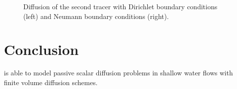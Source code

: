 \begin{figure}[h!]
\begin{minipage}[t]{0.5\textwidth}
 \centering
\end{minipage}
\begin{minipage}[t]{0.5\textwidth}
 \centering
\end{minipage}
\begin{minipage}[t]{0.5\textwidth}
 \centering
\end{minipage}
\begin{minipage}[t]{0.5\textwidth}
 \centering
\end{minipage}
\begin{minipage}[t]{0.5\textwidth}
 \centering
\end{minipage}
\begin{minipage}[t]{0.5\textwidth}
 \centering
\end{minipage}
\begin{minipage}[t]{0.5\textwidth}
 \centering
\end{minipage}
\begin{minipage}[t]{0.5\textwidth}
 \centering
\end{minipage}
  \caption{Diffusion of the second tracer with Dirichlet boundary conditions (left) and Neumann boundary conditions (right).}
  \label{fig:tracerdiffusion:T2_dir}
\end{figure}


\section{Conclusion}
 is able to model passive scalar diffusion problems in shallow water
flows with finite volume diffusion schemes.
